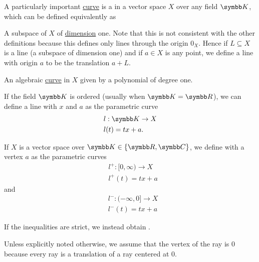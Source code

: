 \begin{definition}\label{def:geometric_line}
  A particularly important \hyperref[def:hypersurface]{curve} is a  in a vector space \( X \) over any field \( \BK \), which can be defined equivalently as

  \begin{defenum}
     A subspace of \( X \) of \hyperref[def:vector_space_dimension]{dimension} one. Note that this is not consistent with the other definitions because this defines only lines through the origin \( 0_X \). Hence if \( L \subseteq X \) is a line (a subspace of dimension one) and if \( a \in X \) is any point, we define a line with origin \( a \) to be the translation \( a + L \).

     An algebraic \hyperref[def:affine_variety/algebraic_curve]{curve} in \( X \) given by a polynomial of degree one.

     If the field \( \BK \) is ordered (usually when \( \BK = \BR \)), we can define a line with  \( x \) and  \( a \) as the parametric curve
    \begin{align*}
      &l: \BK \to X \\
      &l(t) = tx + a.
    \end{align*}
  \end{defenum}
\end{definition}

\begin{definition}\label{def:geometric_ray}
  If \( X \) is a vector space over \( \BK \in \{ \BR, \BC \} \), we define  with a vertex \( a \) as the parametric curves
  \begin{align*}
    &l^+: [0, \infty) \to X \\
    &l^+(t) = tx + a
  \end{align*}
  and
  \begin{align*}
    &l^-: (-\infty, 0] \to X \\
    &l^-(t) = tx + a
  \end{align*}

  If the inequalities are strict, we instead obtain .

  Unless explicitly noted otherwise, we assume that the vertex of the ray is \( 0 \) because every ray is a translation of a ray centered at \( 0 \).
\end{definition}

